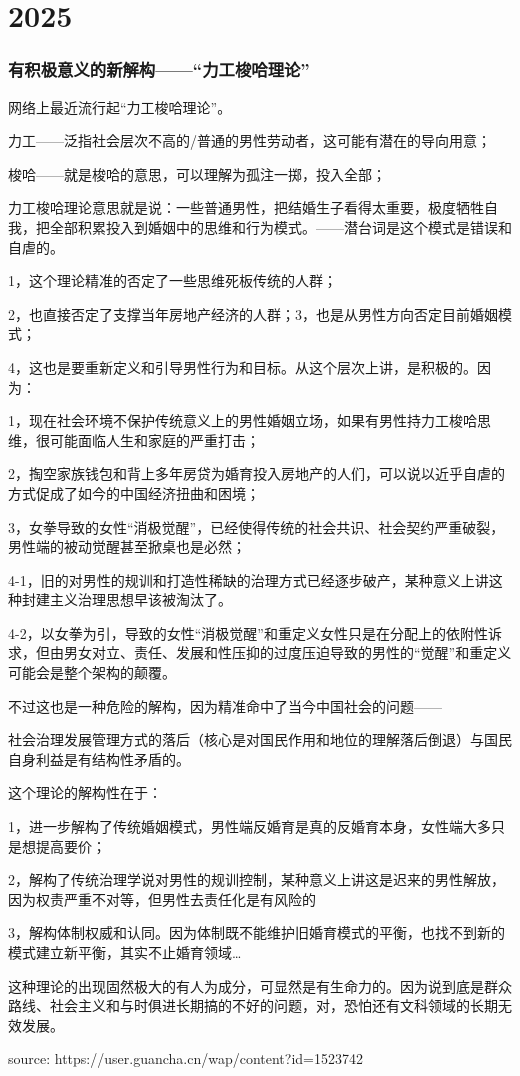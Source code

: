\part{2025}
\section{
    有积极意义的新解构——“力工梭哈理论”
} {
    \setlength{\parindent}{2em}
    网络上最近流行起“力工梭哈理论”。

力工——泛指社会层次不高的/普通的男性劳动者，这可能有潜在的导向用意；

梭哈——就是梭哈的意思，可以理解为孤注一掷，投入全部；

力工梭哈理论意思就是说：一些普通男性，把结婚生子看得太重要，极度牺牲自我，把全部积累投入到婚姻中的思维和行为模式。——潜台词是这个模式是错误和自虐的。

1，这个理论精准的否定了一些思维死板传统的人群；

2，也直接否定了支撑当年房地产经济的人群；3，也是从男性方向否定目前婚姻模式；

4，这也是要重新定义和引导男性行为和目标。从这个层次上讲，是积极的。因为：

1，现在社会环境不保护传统意义上的男性婚姻立场，如果有男性持力工梭哈思维，很可能面临人生和家庭的严重打击；

2，掏空家族钱包和背上多年房贷为婚育投入房地产的人们，可以说以近乎自虐的方式促成了如今的中国经济扭曲和困境；

3，女拳导致的女性“消极觉醒”，已经使得传统的社会共识、社会契约严重破裂，男性端的被动觉醒甚至掀桌也是必然；

4-1，旧的对男性的规训和打造性稀缺的治理方式已经逐步破产，某种意义上讲这种封建主义治理思想早该被淘汰了。

4-2，以女拳为引，导致的女性“消极觉醒”和重定义女性只是在分配上的依附性诉求，但由男女对立、责任、发展和性压抑的过度压迫导致的男性的“觉醒”和重定义可能会是整个架构的颠覆。

不过这也是一种危险的解构，因为精准命中了当今中国社会的问题——

社会治理发展管理方式的落后（核心是对国民作用和地位的理解落后倒退）与国民自身利益是有结构性矛盾的。

这个理论的解构性在于：

1，进一步解构了传统婚姻模式，男性端反婚育是真的反婚育本身，女性端大多只是想提高要价；

2，解构了传统治理学说对男性的规训控制，某种意义上讲这是迟来的男性解放，因为权责严重不对等，但男性去责任化是有风险的

3，解构体制权威和认同。因为体制既不能维护旧婚育模式的平衡，也找不到新的模式建立新平衡，其实不止婚育领域…

这种理论的出现固然极大的有人为成分，可显然是有生命力的。因为说到底是群众路线、社会主义和与时俱进长期搞的不好的问题，对，恐怕还有文科领域的长期无效发展。


source: https://user.guancha.cn/wap/content?id=1523742
}